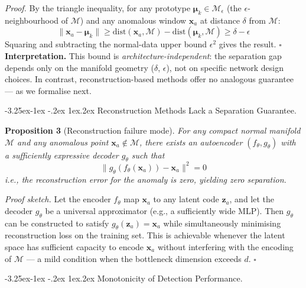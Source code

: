 \documentclass{iopjournal}
\makeatletter
\renewcommand\subsubsection{\@startsection{subsubsection}{3}{\z@}%
                                     {-3.25ex\@plus -1ex \@minus -.2ex}%
                                     {1ex\@plus .2ex}%
                                     {\reset@font\normalsize\itshape}}
\makeatother
\begin{document}
\emph{Proof.} By the triangle inequality, for any prototype $\boldsymbol{\mu}_k \in \mathcal{M}_\epsilon$ (the $\epsilon$-neighbourhood of $\mathcal{M}$) and any anomalous window $\mathbf{x}_a$ at distance $\delta$ from $\mathcal{M}$:
\begin{equation}
\|\mathbf{x}_a - \boldsymbol{\mu}_k\| \geq \mathrm{dist}(\mathbf{x}_a, \mathcal{M}) - \mathrm{dist}(\boldsymbol{\mu}_k, \mathcal{M}) \geq \delta - \epsilon
\end{equation}
Squaring and subtracting the normal-data upper bound $\epsilon^2$ gives the result. $\square$
\textbf{Interpretation.} This bound is \emph{architecture-independent}: the separation gap depends only on the manifold geometry ($\delta$, $\epsilon$), not on specific network design choices. In contrast, reconstruction-based methods offer no analogous guarantee --- as we formalise next.

\subsubsection{Reconstruction Methods Lack a Separation Guarantee.}

\textbf{Proposition 3} (Reconstruction failure mode). \emph{For any compact normal manifold $\mathcal{M}$ and any anomalous point $\mathbf{x}_a \notin \mathcal{M}$, there exists an autoencoder $(f_\theta, g_\theta)$ with a sufficiently expressive decoder $g_\theta$ such that}
\begin{equation}
\|g_\theta(f_\theta(\mathbf{x}_a)) - \mathbf{x}_a\|^2 = 0
\end{equation}
\emph{i.e., the reconstruction error for the anomaly is zero, yielding zero separation.}

\emph{Proof sketch.} Let the encoder $f_\theta$ map $\mathbf{x}_a$ to any latent code $\mathbf{z}_a$, and let the decoder $g_\theta$ be a universal approximator (e.g., a sufficiently wide MLP). Then $g_\theta$ can be constructed to satisfy $g_\theta(\mathbf{z}_a) = \mathbf{x}_a$ while simultaneously minimising reconstruction loss on the training set. This is achievable whenever the latent space has sufficient capacity to encode $\mathbf{x}_a$ without interfering with the encoding of $\mathcal{M}$ --- a mild condition when the bottleneck dimension exceeds $d$. $\square$

\subsubsection{Monotonicity of Detection Performance.}
\end{document}
